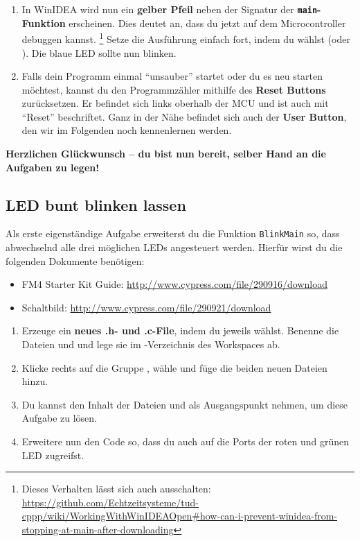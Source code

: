 \begin{enumerate}
\item 
In WinIDEA wird nun ein \textbf{gelber Pfeil} neben der Signatur der \textbf{\lstinline|main|-Funktion} erscheinen.
Dies deutet an, dass du jetzt auf dem Microcontroller debuggen kannst.
\footnote{Dieses Verhalten lässt sich auch ausschalten: \url{https://github.com/Echtzeitsysteme/tud-cppp/wiki/WorkingWithWinIDEAOpen\#how-can-i-prevent-winidea-from-stopping-at-main-after-downloading}}
Setze die Ausführung einfach fort, indem du \textbf{} wählst (oder ).
Die blaue LED sollte nun blinken.

\item 
Falls dein Programm einmal \enquote{unsauber} startet oder du es neu starten möchtest, kannst du den Programmzähler mithilfe des \textbf{Reset Buttons} zurücksetzen.
Er befindet sich links oberhalb der MCU und ist auch mit \enquote{Reset} beschriftet.
Ganz in der Nähe befindet sich auch der \textbf{User Button}, den wir im Folgenden noch kennenlernen werden.
\end{enumerate}

\noindent\textbf{Herzlichen Glückwunsch -- du bist nun bereit, selber Hand an die Aufgaben zu legen!}

\subsection{LED bunt blinken lassen}
Als erste eigenständige Aufgabe erweiterst du die Funktion \lstinline|BlinkMain| so, dass abwechselnd alle drei möglichen LEDs angesteuert werden.
Hierfür wirst du die folgenden Dokumente benötigen:
\begin{itemize}
\item 
FM4 Starter Kit Guide: \url{http://www.cypress.com/file/290916/download}
\item 
Schaltbild: \url{http://www.cypress.com/file/290921/download}
\end{itemize}

\begin{enumerate}
\item 
Erzeuge ein \textbf{neues .h- und .c-File}, indem du jeweils  wählst.
Benenne die Dateien  und  und lege sie im -Verzeichnis des Workspaces ab.

\item 
Klicke rechts auf die Gruppe \label{src}, wähle  und füge die beiden neuen Dateien hinzu.

\item 
Du kannst den Inhalt der Dateien  und  als Ausgangspunkt nehmen, um diese Aufgabe zu lösen.

\item
Erweitere nun den Code so, dass du auch auf die Ports der roten und grünen LED zugreifst.
\end{enumerate}


